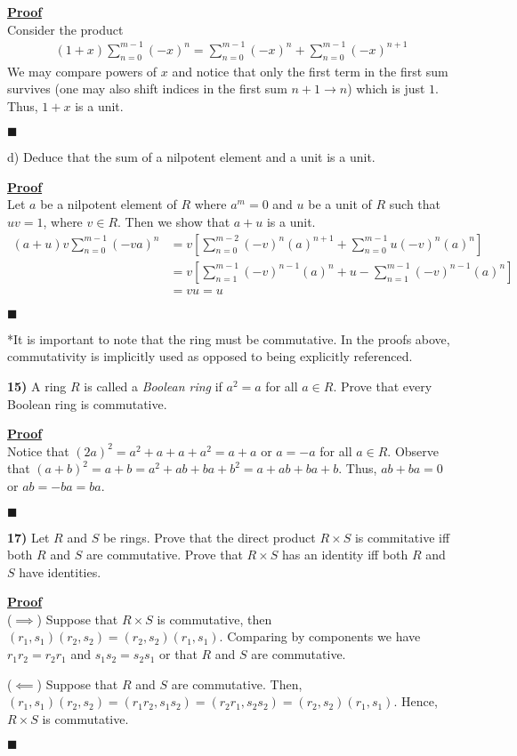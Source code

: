 \documentclass[12pt,a4paper]{article}
\newcommand{\prob}[2]{\textbf{#1)} #2}
\newenvironment{proof}
{
\textbf{\underline{Proof}} \\
}
{
\begin{flushright}
$\blacksquare$
\end{flushright}}
\begin{document}
\begin{proof}
Consider the product
\begin{align*}
(1+x)\sum_{n=0}^{m-1} (-x)^{n} = \sum_{n=0}^{m-1} (-x)^{n} + \sum_{n=0}^{m-1} (-x)^{n+1}
\end{align*}
We may compare powers of $x$ and notice that only the first term in the first sum survives (one may also shift indices in the first sum $n+1 \rightarrow n$) which is just $1$. Thus, $1+x$ is a unit.
\end{proof}

d) Deduce that the sum of a nilpotent element and a unit is a unit.

\begin{proof}
Let $a$ be a nilpotent element of $R$ where $a^m = 0$ and $u$ be a unit of $R$ such that $uv = 1$, where $v \in R$. Then we show that $a + u$ is a unit.
\begin{align*}
(a+u)v\sum_{n=0}^{m-1} (-va)^n &= v\left[\sum_{n=0}^{m-2} (-v)^n(a)^{n+1} + \sum_{n=0}^{m-1} u(-v)^n(a)^n \right] \\
&= v\left[\sum_{n=1}^{m-1} (-v)^{n-1}(a)^{n} + u - \sum_{n=1}^{m-1} (-v)^{n-1}(a)^n \right] \\
&= vu = u
\end{align*}
\end{proof}

*It is important to note that the ring must be commutative. In the proofs above, commutativity is implicitly used as opposed to being explicitly referenced.

\prob{15}{A ring $R$ is called a \textit{Boolean ring} if $a^2 = a$ for all $a \in R$. Prove that every Boolean ring is commutative.}

\begin{proof}
Notice that $(2a)^2 = a^2 + a + a + a^2 = a + a$ or $a = -a$ for all $a \in R$. Observe that $(a + b)^2 = a + b = a^2 + ab + ba + b^2 = a + ab + ba + b$. Thus, $ab + ba = 0$ or $ab = -ba = ba$. 
\end{proof}

\prob{17}{Let $R$ and $S$ be rings. Prove that the direct product $R \times S$ is commitative iff both $R$ and $S$ are commutative. Prove that $R \times S$ has an identity iff both $R$ and $S$ have identities.}

\begin{proof}
($\implies$) Suppose that $R \times S$ is commutative, then $(r_1,s_1)(r_2,s_2) = (r_2,s_2)(r_1,s_1)$. Comparing by components we have $r_1r_2 = r_2r_1$ and $s_1s_2 = s_2s_1$ or that $R$ and $S$ are commutative.

($\impliedby$) Suppose that $R$ and $S$ are commutative. Then, $(r_1,s_1)(r_2,s_2) = (r_1r_2,s_1s_2) = (r_2r_1,s_2s_2) = (r_2,s_2)(r_1,s_1)$. Hence, $R \times S$ is commutative.
\end{proof}
\end{document}
